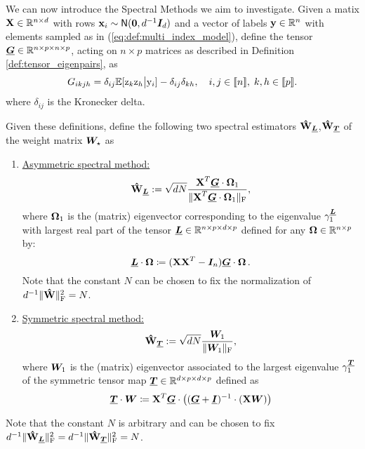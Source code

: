 We can now introduce the Spectral Methods we aim to investigate. Given a matix $\boldsymbol{\mathbf{X}}\in\mathbb{R}^{n\times d}$ with rows $\boldsymbol{\mathbf{x}}_i\sim\mathsf{N}({\boldsymbol 0},d^{-1}{\boldsymbol I}_d)$ and a vector of labels $\boldsymbol{\mathbf{y}} \in\mathbb{R}^n$ with elements sampled as in (\ref{eq:def:multi_index_model}), define the tensor ${\underline{\bm{G}}}\in\mathbb{R}^{n\times p \times n \times p}$, acting on $n\times p$ matrices as described in Definition \ref{def:tensor_eigenpairs}, as
\begin{equation}\label{eq:def:tensor_G}
    G_{ikjh} = \delta_{ij}\mathbb{E}[{ \mathrm{z} }_k{ \mathrm{z} }_h\big|{ \mathrm{y} }_i] - \delta_{ij}\delta_{kh},\quad i,j\in \llbracket n \rrbracket ,\;k,h\in \llbracket p \rrbracket .
\end{equation}
where $\delta_{ij}$ is the Kronecker delta. 

Given these definitions, define the following two spectral estimators $\boldsymbol{\mathbf{\hat{W}}}_{{\underline{\bm{L}}}}$,$\boldsymbol{\mathbf{\hat{W}}}_{{\underline{\bm{T}}}}$ of the weight matrix ${\boldsymbol W}_\star$ as
\begin{enumerate}
    \item \underline{Asymmetric spectral method:}
    \begin{equation}\label{eq:def:spectral_asymmetric}
    \boldsymbol{\mathbf{\hat{W}}}_{{\underline{\bm{L}}}}:= \sqrt{dN}\frac{\boldsymbol{\mathbf{X}}^T{\underline{\bm{G}}}\cdot\boldsymbol{\Omega}_1}{ \|\boldsymbol{\mathbf{X}}^T{\underline{\bm{G}}}\cdot\boldsymbol{\Omega}_1 \|_{\mathrm{F}} },
\end{equation}
 where $\boldsymbol{\Omega}_1$ is the (matrix) eigenvector corresponding to the eigenvalue $\gamma_1^{{\underline{\bm{L}}}}$ with largest real part of the tensor  ${\underline{\bm{L}}}\in\mathbb{R}^{n\times p\times d\times p}$ defined for any $\bm{\Omega} \in \mathbb{R}^{n \times p}$ by:
\begin{equation}\label{eq:def:spectral_asymmetric}
{\ensuremath{\underline{\bm{L}}}} \cdot \boldsymbol{\Omega} \coloneqq (\boldsymbol{\mathbf{X}}\boldsymbol{\mathbf{X}}^T - {\boldsymbol I}_n){\underline{\bm{G}}}\cdot\boldsymbol{\Omega} \, .
\end{equation}
Note that the constant $N$ can be chosen to fix the normalization of
$d^{-1} \|\boldsymbol{\mathbf{\hat{W}}} \|_{\mathrm{F}} ^2 = N$.
\item \underline{Symmetric spectral method:}
\begin{equation}\label{eq:def:spectral_symmetric}
    \boldsymbol{\mathbf{\hat{W}}}_{{\underline{\bm{T}}}} := \sqrt{dN}\frac{\bm{W}_1}{ \|\bm{W}_1 \|_{\mathrm{F}} },
\end{equation}
 where $\bm{W}_1$ is the (matrix) eigenvector associated to the largest eigenvalue $\gamma_1^{{\underline{\bm{T}}}}$ of the symmetric tensor map ${\underline{\bm{T}}}\in\mathbb{R}^{d\times p\times d\times p}$ defined as
\begin{equation}
{\ensuremath{\underline{\bm{T}}}}\cdot \bm{W} \coloneqq \boldsymbol{\mathbf{X}}^T{\underline{\bm{G}}}\cdot\left(({\underline{\bm{G}}}+{\underline{\bm{I}}})^{-1}\cdot(\boldsymbol{\mathbf{X}}\bm{W})\right)
\end{equation}
\end{enumerate}
Note that the constant $N$ is arbitrary and can be chosen to fix
$d^{-1} \|\boldsymbol{\mathbf{\hat{W}}}_{{\underline{\bm{L}}}} \|_{\mathrm{F}} ^2 = d^{-1} \|\boldsymbol{\mathbf{\hat{W}}}_{{\underline{\bm{T}}}} \|_{\mathrm{F}} ^2 = N$.


